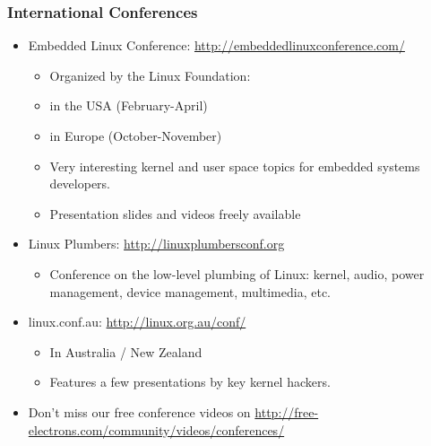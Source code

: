 \begin{frame}
  \frametitle{International Conferences}
  \begin{itemize}
  \item Embedded Linux Conference: \url{http://embeddedlinuxconference.com/}
    \begin{itemize}
    \item Organized by the Linux Foundation:
    \item in the USA (February-April)
    \item in Europe (October-November)
    \item Very interesting kernel and user space topics for embedded
      systems developers.
    \item Presentation slides and videos freely available
    \end{itemize}
  \item Linux Plumbers: \url{http://linuxplumbersconf.org}
    \begin{itemize}
    \item Conference on the low-level plumbing of Linux: kernel,
      audio, power management, device management, multimedia, etc.
    \end{itemize}
  \item linux.conf.au: \url{http://linux.org.au/conf/}
    \begin{itemize}
    \item In Australia / New Zealand
    \item Features a few presentations by key kernel hackers.
    \end{itemize}
  \item Don't miss our free conference videos on
    \url{http://free-electrons.com/community/videos/conferences/}
  \end{itemize}
\end{frame}

